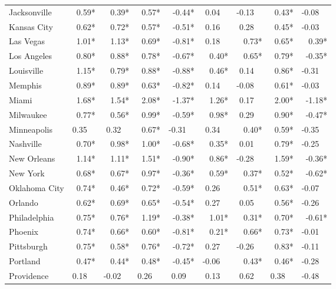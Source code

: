 \begin{tabular}{lrrrrrrrr}
	Jacksonville   &  0.59* &   0.39* &   0.57* &  -0.44* &  0.04~~ & -0.13~~ &   0.43* & -0.08~~ \\
	Kansas City    &  0.62* &   0.72* &   0.57* &  -0.51* &  0.16~~ &  0.28~~ &   0.45* & -0.03~~ \\
	Las Vegas      &  1.01* &   1.13* &   0.69* &  -0.81* &  0.18~~ &   0.73* &   0.65* &   0.39* \\
	Los Angeles    &  0.80* &   0.88* &   0.78* &  -0.67* &   0.40* &   0.65* &   0.79* &  -0.35* \\
	Louisville     &  1.15* &   0.79* &   0.88* &  -0.88* &   0.46* &  0.14~~ &   0.86* & -0.31~~ \\
	Memphis        &  0.89* &   0.89* &   0.63* &  -0.82* &  0.14~~ & -0.08~~ &   0.61* & -0.03~~ \\
	Miami          &  1.68* &   1.54* &   2.08* &  -1.37* &   1.26* &  0.17~~ &   2.00* &  -1.18* \\
	Milwaukee      &  0.77* &   0.56* &   0.99* &  -0.59* &   0.98* &  0.29~~ &   0.90* &  -0.47* \\
	Minneapolis    & 0.35~~ &  0.32~~ &   0.67* & -0.31~~ &  0.34~~ &   0.40* &   0.59* & -0.35~~ \\
	Nashville      &  0.70* &   0.98* &   1.00* &  -0.68* &   0.35* &  0.01~~ &   0.79* & -0.25~~ \\
	New Orleans    &  1.14* &   1.11* &   1.51* &  -0.90* &   0.86* & -0.28~~ &   1.59* &  -0.36* \\
	New York       &  0.68* &   0.67* &   0.97* &  -0.36* &   0.59* &   0.37* &   0.52* &  -0.62* \\
	Oklahoma City  &  0.74* &   0.46* &   0.72* &  -0.59* &  0.26~~ &   0.51* &   0.63* & -0.07~~ \\
	Orlando        &  0.62* &   0.69* &   0.65* &  -0.54* &  0.27~~ &  0.05~~ &   0.56* & -0.26~~ \\
	Philadelphia   &  0.75* &   0.76* &   1.19* &  -0.38* &   1.01* &   0.31* &   0.70* &  -0.61* \\
	Phoenix        &  0.74* &   0.66* &   0.60* &  -0.81* &   0.21* &   0.66* &   0.73* & -0.01~~ \\
	Pittsburgh     &  0.75* &   0.58* &   0.76* &  -0.72* &  0.27~~ & -0.26~~ &   0.83* & -0.11~~ \\
	Portland       &  0.47* &   0.44* &   0.48* &  -0.45* & -0.06~~ &   0.43* &   0.46* & -0.28~~ \\
	Providence     & 0.18~~ & -0.02~~ &  0.26~~ &  0.09~~ &  0.13~~ &  0.62~~ &  0.38~~ & -0.48~~ \\

\end{tabular}
